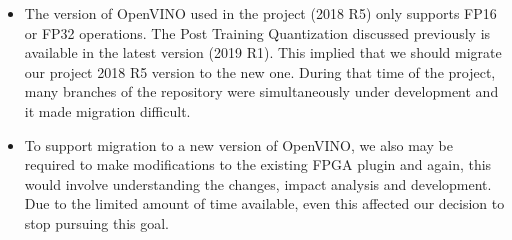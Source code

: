 \begin{itemize}
\item The version of OpenVINO used in the project (2018 R5) only supports FP16 or FP32 operations. The Post Training Quantization discussed previously is available in the latest version (2019 R1). This implied that we should migrate our project 2018 R5 version to the new one. During that time of the project, many branches of the repository were simultaneously under development and it made migration difficult. 
\item To support migration to a new version of OpenVINO, we also may be required to make modifications to the existing FPGA plugin and again, this would involve understanding the changes, impact analysis and development. Due to the limited amount of time available, even this affected our decision to stop pursuing this goal.
\end{itemize}

